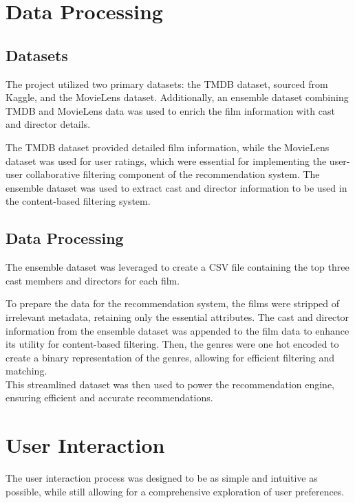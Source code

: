 \section{Data Processing}
\label{sec:data_processing_implementation}

\subsection{Datasets}
\label{sec:datasets}
The project utilized two primary datasets: the TMDB dataset\cite{tmdb}, sourced from Kaggle\cite{asaniczka_themoviedb_org_2025}, and the MovieLens dataset\cite{10.1145/2827872}. Additionally, an ensemble dataset\cite{banik2017movies} combining TMDB and MovieLens data was used to enrich the film information with cast and director details.

The TMDB dataset provided detailed film information, while the MovieLens dataset was used for user ratings, which were essential for implementing the user-user collaborative filtering component of the recommendation system. The ensemble dataset was used to extract cast and director information to be used in the content-based filtering system.

\subsection{Data Processing}
\label{sec:data_processing}
The ensemble dataset was leveraged to create a CSV file containing the top three cast members and directors for each film.

To prepare the data for the recommendation system, the films were stripped of irrelevant metadata, retaining only the essential attributes. 
The cast and director information from the ensemble dataset was appended to the film data to enhance its utility for content-based filtering. 
Then, the genres were one hot encoded to create a binary representation of the genres, allowing for efficient filtering and matching.
\\
This streamlined dataset was then used to power the recommendation engine, ensuring efficient and accurate recommendations.


\section{User Interaction}
\label{sec:user_interaction}
The user interaction process was designed to be as simple and intuitive as possible, while still allowing for a comprehensive exploration of user preferences.

